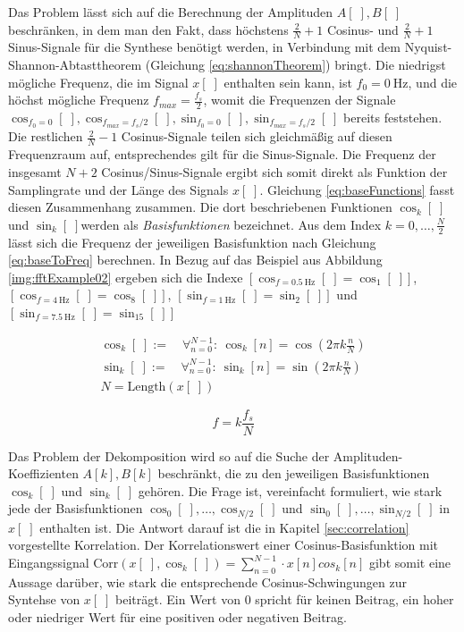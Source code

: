 Das Problem lässt sich auf die Berechnung der Amplituden $A[\;],B[\; ]$ beschränken, in dem man den Fakt, dass höchstens $\frac{2}{N} + 1$ Cosinus- und $\frac{2}{N} + 1$ Sinus-Signale für die Synthese benötigt werden, in Verbindung mit dem Nyquist-Shannon-Abtasttheorem (Gleichung \ref{eq:shannonTheorem}) bringt. Die niedrigst mögliche Frequenz, die im Signal $x[\;]$ enthalten sein kann, ist $f_0 = \SI{0}{\hertz}$, und die höchst mögliche Frequenz $f_{max} = \frac{f_s}{2}$, womit die Frequenzen der Signale $\cos_{f_0 = 0}[\;] , \cos_{f_{max} = f_s/2}[\;],\sin_{f_0 = 0}[\;], \sin_{f_{max} = f_s/2}[\;]$ bereits feststehen. Die restlichen $\frac{2}{N} - 1$ Cosinus-Signale teilen sich gleichmäßig auf diesen Frequenzraum auf, entsprechendes gilt für die Sinus-Signale. Die Frequenz der insgesamt $N+2$ Cosinus/Sinus-Signale ergibt sich somit direkt als Funktion der Samplingrate und der Länge des Signals $x[\;]$. Gleichung \ref{eq:baseFunctions} fasst diesen Zusammenhang zusammen. Die dort beschriebenen Funktionen $\cos_k[\;]$ und $\sin_k[\;]$werden als \emph{Basisfunktionen} bezeichnet. Aus dem  Index $k = 0 ,\ldots, \frac{N}{2}$ lässt sich die Frequenz der jeweiligen Basisfunktion nach Gleichung \ref{eq:baseToFreq} berechnen.\cite[140 - 151, S.]{dspGuide}  In Bezug auf das Beispiel aus Abbildung \ref{img:fftExample02} ergeben sich die Indexe $[\cos_{f=\SI{0.5}{\hertz}}[\;] = \cos_1[\;]]$, $[\cos_{f=\SI{4}{\hertz}}[\;] = \cos_8[\;]]$, $[\sin_{f=\SI{1}{\hertz}}[\;] = \sin_2[\;]]$ und $[\sin_{f=\SI{7.5}{\hertz}}[\;] = \sin_{15}[\;]]$

\begin{equation}
\label{eq:baseFunctions}
\begin{split}
\cos_k[\;] := \quad \mathop{\forall}_{n = 0}^{N-1} :\ \cos_k[n] = \cos(2\pi k \frac{n}{N}) \\
\sin_k[\;] := \quad \mathop{\forall}_{n = 0}^{N-1} :\ \sin_k[n] = \sin(2\pi k \frac{n}{N}) \\
N = \text{Length} (x[\;] )
\end{split}
\end{equation} 

\begin{equation}
\label{eq:baseToFreq}
f = k\frac{f_s}{N} 
\end{equation} 

Das Problem der Dekomposition wird so auf die Suche der Amplituden-Koeffizienten $A[k], B[k]$ beschränkt, die zu den jeweiligen Basisfunktionen $\cos_k[\;]$ und $\sin_k[\;]$ gehören. Die Frage ist, vereinfacht formuliert, wie \glqq stark\grqq{} jede der Basisfunktionen $\cos_0[\;], \ldots ,\cos_{N/2}[\;]$ und $\sin_0[\;] ,\ldots ,\sin_{N/2}[\;]$ in $x[\;]$ enthalten ist.  Die Antwort darauf ist die in Kapitel \ref{sec:correlation} vorgestellte Korrelation. Der Korrelationswert einer Cosinus-Basisfunktion mit Eingangssignal Corr$(x[\;],\cos_k[\;]) = \sum_{n=0}^{N-1} \cdot x[n]cos_k[n]$ gibt somit eine Aussage darüber, wie stark die entsprechende Cosinus-Schwingungen zur Syntehse von $x[\;]$ beiträgt. Ein Wert von $0$ spricht für keinen Beitrag, ein hoher oder niedriger Wert für eine positiven oder negativen Beitrag. \cite[S. 157 - 158]{dspGuide}


